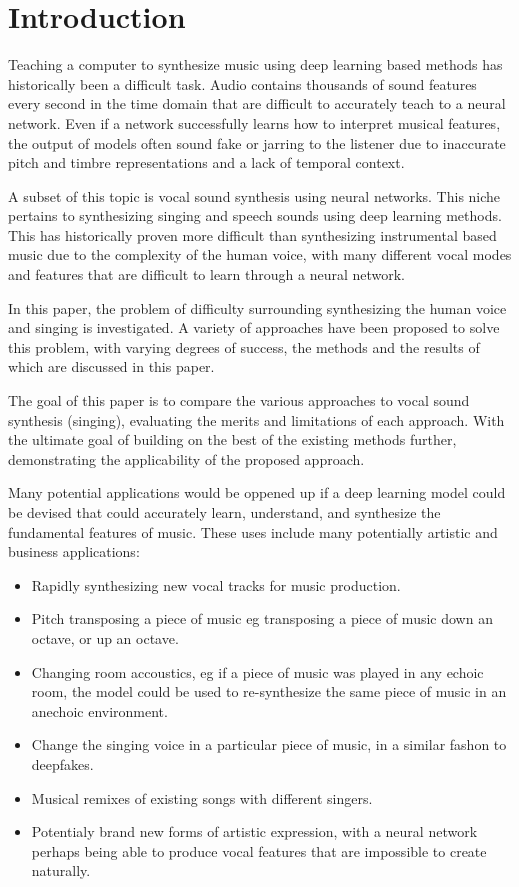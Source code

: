 \chapter{Introduction}

\noindent Teaching a computer to synthesize music using deep learning based methods has historically been a difficult task. Audio contains thousands of sound features every second in the time domain that are difficult to accurately teach to a neural network. Even if a network successfully learns how to interpret musical features, the output of models often sound fake or jarring to the listener due to inaccurate pitch and timbre representations and a lack of temporal context.

A subset of this topic is vocal sound synthesis using neural networks. This niche pertains to synthesizing singing and speech sounds using deep learning methods. This has historically proven more difficult than synthesizing instrumental based music due to the complexity of the human voice, with many different vocal modes and features that are difficult to learn through a neural network.

In this paper, the problem of difficulty surrounding synthesizing the human voice and singing is investigated. A variety of approaches have been proposed to solve this problem, with varying degrees of success, the methods and the results of which are discussed in this paper.

The goal of this paper is to compare the various approaches to vocal sound synthesis (singing), evaluating the merits and limitations of each approach. With the ultimate goal of building on the best of the existing methods further, demonstrating the applicability of the proposed approach.

Many potential applications would be oppened up if a deep learning model could be devised that could accurately learn, understand, and synthesize the fundamental features of music. These uses include many potentially artistic and business applications:

\begin{itemize}
    \item Rapidly synthesizing new vocal tracks for music production.
    \item Pitch transposing a piece of music eg transposing a piece of music down an octave, or up an octave.
    \item Changing room accoustics, eg if a piece of music was played in any echoic room, the model could be used to re-synthesize the same piece of music in an anechoic environment.
    \item Change the singing voice in a particular piece of music, in a similar fashon to deepfakes.
    \item Musical remixes of existing songs with different singers.
    \item Potentialy brand new forms of artistic expression, with a neural network perhaps being able to produce vocal features that are impossible to create naturally.
\end{itemize}



